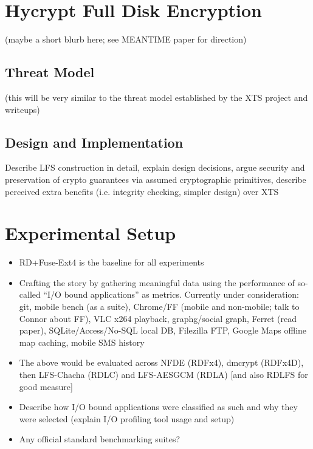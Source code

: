 \documentclass[letterpaper,twocolumn,10pt]{article}
\begin{document}
\section{Hycrypt Full Disk Encryption}
(maybe a short blurb here; see MEANTIME paper for direction)

\subsection{Threat Model}
(this will be very similar to the threat model established by the XTS project and writeups)

\subsection{Design and Implementation}
Describe LFS construction in detail, explain design decisions, argue security and preservation of crypto guarantees via
assumed cryptographic primitives, describe perceived extra benefits (i.e. integrity checking, simpler design) over XTS

\section{Experimental Setup}
\begin{itemize}
  \item RD+Fuse-Ext4 is the baseline for all experiments
  \item Crafting the story by gathering meaningful data using the performance of so-called ``I/O bound applications'' as
  metrics. Currently under consideration: git, mobile bench (as a suite), Chrome/FF (mobile and non-mobile; talk to
  Connor about FF), VLC x264 playback, graphg/social graph, Ferret (read paper), SQLite/Access/No-SQL local DB,
  Filezilla FTP, Google Maps offline map caching, mobile SMS history
  \item The above would be evaluated across NFDE (RDFx4), dmcrypt (RDFx4D), then LFS-Chacha (RDLC) and LFS-AESGCM (RDLA)
  [and also RDLFS for good measure]
  \item Describe how I/O bound applications were classified as such and why they were selected (explain I/O profiling
  tool usage and setup)
  \item Any official standard benchmarking suites?
\end{itemize}
\end{document}
